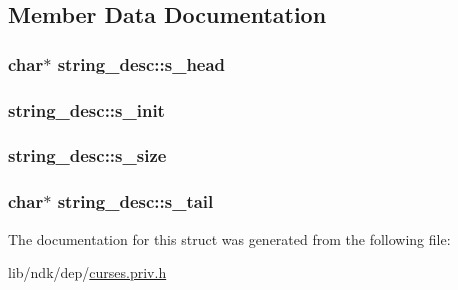 \subsection{Member Data Documentation}
\hypertarget{structstring__desc_ae5413d01e222488497e35618d94cfef0}{
\subsubsection[{s\-\_\-head}]{\setlength{\rightskip}{0pt plus 5cm}char$\ast$ string\-\_\-desc\-::s\-\_\-head}}\label{structstring__desc_ae5413d01e222488497e35618d94cfef0}
\hypertarget{structstring__desc_aa8af30bec0502dd85e6fd55af630aa96}{
\subsubsection[{s\-\_\-init}]{ string\-\_\-desc\-::s\-\_\-init}}\label{structstring__desc_aa8af30bec0502dd85e6fd55af630aa96}
\hypertarget{structstring__desc_adaa2effe32b0daaee4055a5db33190d0}{
\subsubsection[{s\-\_\-size}]{ string\-\_\-desc\-::s\-\_\-size}}\label{structstring__desc_adaa2effe32b0daaee4055a5db33190d0}
\hypertarget{structstring__desc_a97d51c0f0a7e1d7cd85e639b46f977af}{
\subsubsection[{s\-\_\-tail}]{\setlength{\rightskip}{0pt plus 5cm}char$\ast$ string\-\_\-desc\-::s\-\_\-tail}}\label{structstring__desc_a97d51c0f0a7e1d7cd85e639b46f977af}


The documentation for this struct was generated from the following file\-:\begin{DoxyCompactItemize}
\item 
lib/ndk/dep/\hyperlink{curses_8priv_8h}{curses.\-priv.\-h}\end{DoxyCompactItemize}
